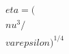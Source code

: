 \documentclass[preview]{standalone}
\begin{document}
\begin{align*}
\quad\\eta = (\quad\\nu^3 / \quad\\varepsilon)^{1/4}
\end{align*}
\end{document}
